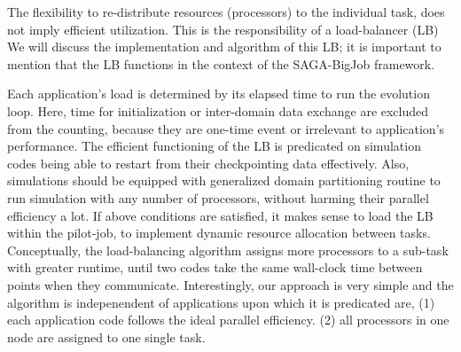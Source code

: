 \documentclass[conference,final]{IEEEtran}
\begin{document}


The flexibility to re-distribute resources (processors) to the
individual task, does not imply efficient utilization. This is the
responsibility of a load-balancer (LB) We will discuss the
implementation and algorithm of this LB; it is important to mention
that the LB functions in the context of the SAGA-BigJob framework.

Each application's load is determined by its elapsed time to run the
evolution loop. Here, time for initialization or inter-domain data
exchange are excluded from the counting, because they are one-time
event or irrelevant to application's performance.  The efficient
functioning of the LB is predicated on simulation codes being able to
restart from their checkpointing data effectively.  Also, simulations
should be equipped with generalized domain partitioning routine to run
simulation with any number of processors, without harming their
parallel efficiency a lot. If above conditions are satisfied, it makes
sense to load the LB within the pilot-job, to implement dynamic
resource allocation between tasks.  Conceptually, the load-balancing
algorithm assigns more processors to a sub-task with greater runtime,
until two codes take the same wall-clock time between points when they
communicate. Interestingly, our approach is very simple and the
algorithm is indepenendent of applications upon which it is predicated
are, (1) each application code follows the ideal parallel efficiency.
(2) all processors in one node are assigned to one single task.
\end{document}
